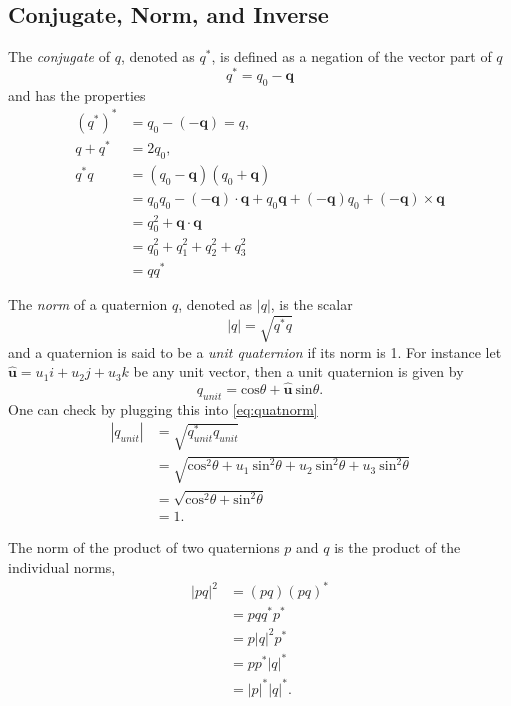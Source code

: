 \subsection{Conjugate, Norm, and Inverse}
The \textit{conjugate} of $q$, denoted as $q^*$, is defined as a negation of the vector part of $q$
\begin{equation}
q^* = q_0 - \textbf{q}
\label{eq:quatconjugate}
\end{equation}
and has the properties
\begin{align*}
(q^*)^* &= q_0 - (-\textbf{q}) = q, \\
q + q^* &= 2q_0, \\
q^*q &= (q_0 - \textbf{q})(q_0 + \textbf{q}) \\
&= q_0q_0 - (-\textbf{q}) \cdot \textbf{q} + q_0\textbf{q} + (-\textbf{q})q_0 + (-\textbf{q}) \times \textbf{q} \\
&= q_0^2 + \textbf{q} \cdot \textbf{q} \\
&= q_0^2 + q_1^2 + q_2^2 + q_3^2 \\
&= qq^*
\end{align*}

The \textit{norm} of a quaternion $q$, denoted as $|q|$, is the scalar
\begin{equation*}
|q| = \sqrt{q^*q}
\label{eq:quatnorm}
\end{equation*}
and a quaternion is said to be a \textit{unit quaternion} if its norm is 1.
For instance let $\mathbf{\hat{u}} = u_1i+u_2j+u_3k$ be any unit vector, then a unit quaternion is given by
\begin{equation*}
q_{unit} = \mbox{cos}\theta + \mathbf{\hat{u}}~\mbox{sin}\theta.
\end{equation*}
One can check by plugging this into \eqref{eq:quatnorm}
\begin{align*}
|q_{unit}| &= \sqrt{q_{unit}^* q_{unit}} \\
&= \sqrt{\mbox{cos}^2\theta + u_1~\mbox{sin}^2\theta + u_2~\mbox{sin}^2\theta + u_3~\mbox{sin}^2\theta} \\
&= \sqrt{\mbox{cos}^2\theta + \mbox{sin}^2\theta} \\
&= 1.
\end{align*}

The norm of the product of two quaternions $p$ and $q$ is the product of the individual norms,
\begin{align*}
|pq|^2 &= (pq)(pq)^* \\
&= pqq^*p^* \\
&= p|q|^2p^* \\
&= pp^*|q|^* \\
&= |p|^* |q|^*.
\end{align*}

